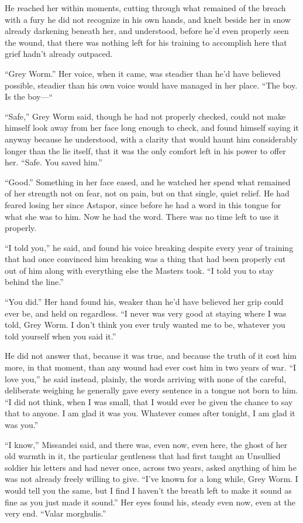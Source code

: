 \sceneBreak

He reached her within moments, cutting through what remained of the breach with a fury he did not recognize in his own hands, and knelt beside her in snow already darkening beneath her, and understood, before he’d even properly seen the wound, that there was nothing left for his training to accomplish here that grief hadn’t already outpaced.

“Grey Worm.” Her voice, when it came, was steadier than he’d have believed possible, steadier than his own voice would have managed in her place. “The boy. Is the boy—“

“Safe,” Grey Worm said, though he had not properly checked, could not make himself look away from her face long enough to check, and found himself saying it anyway because he understood, with a clarity that would haunt him considerably longer than the lie itself, that it was the only comfort left in his power to offer her. “Safe. You saved him.”

“Good.” Something in her face eased, and he watched her spend what remained of her strength not on fear, not on pain, but on that single, quiet relief. He had feared losing her since Astapor, since before he had a word in this tongue for what she was to him. Now he had the word. There was no time left to use it properly.

“I told you,” he said, and found his voice breaking despite every year of training that had once convinced him breaking was a thing that had been properly cut out of him along with everything else the Masters took. “I told you to stay behind the line.”

“You did.” Her hand found his, weaker than he’d have believed her grip could ever be, and held on regardless. “I never was very good at staying where I was told, Grey Worm. I don’t think you ever truly wanted me to be, whatever you told yourself when you said it.”

He did not answer that, because it was true, and because the truth of it cost him more, in that moment, than any wound had ever cost him in two years of war. “I love you,” he said instead, plainly, the words arriving with none of the careful, deliberate weighing he generally gave every sentence in a tongue not born to him. “I did not think, when I was small, that I would ever be given the chance to say that to anyone. I am glad it was you. Whatever comes after tonight, I am glad it was you.”

“I know,” Missandei said, and there was, even now, even here, the ghost of her old warmth in it, the particular gentleness that had first taught an Unsullied soldier his letters and had never once, across two years, asked anything of him he was not already freely willing to give. “I’ve known for a long while, Grey Worm. I would tell you the same, but I find I haven’t the breath left to make it sound as fine as you just made it sound.” Her eyes found his, steady even now, even at the very end. “Valar morghulis.”

